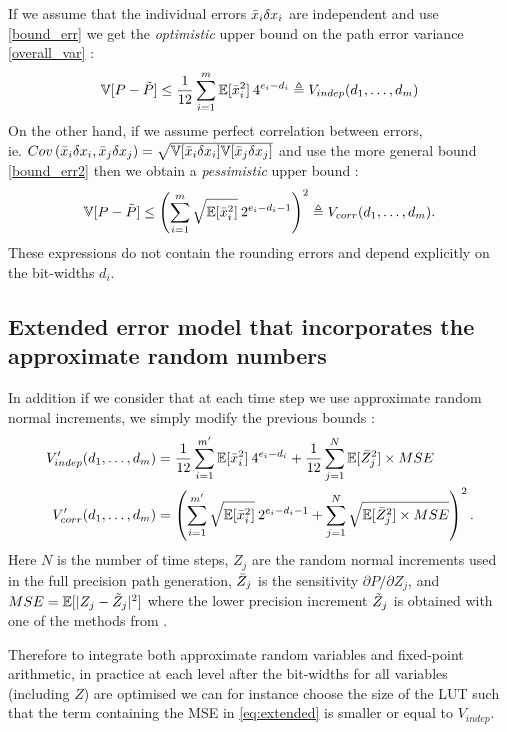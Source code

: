 If we assume that the individual errors $\Bar{x}_i\delta x_i$ are independent and use \eqref{bound_err} we get the \textit{optimistic} upper bound on the path error variance \eqref{overall_var} :
\begin{equation} \label{optimistic}
    \mathbb{V}[P- \Tilde{P}] \leq \frac{1}{12}\sum_{i=1}^m \mathbb{E}[\Bar{x}_i^2] \: 4^{e_i-d_i} \triangleq V_{indep}(d_1,\ldots,d_m)
\end{equation}
On the other hand, if we assume perfect correlation between errors, \\ ie.  $Cov\left(\Bar{x}_i\delta x_i,\Bar{x}_j\delta x_j\right) = \sqrt{\mathbb{V}[\Bar{x}_i\delta x_i]\mathbb{V}[\Bar{x}_j\delta x_j]}$ and use the more general bound \eqref{bound_err2} then we obtain a \textit{pessimistic} upper bound :
\begin{equation} \label{pessimistic}
    \mathbb{V}[P- \Tilde{P}] \leq \left( \sum_{i=1}^m \sqrt{\mathbb{E}[\Bar{x}_i^2]}\: 2^{e_i-d_i-1} \right)^2 \triangleq V_{corr}(d_1,\ldots,d_m).
\end{equation}
These expressions do not contain the rounding errors and depend explicitly on the bit-widths $d_i$. 


\subsection{Extended error model that incorporates the approximate random numbers}
In addition if we consider that at each time step we use approximate random normal increments, we simply modify the previous bounds :
\begin{align} \label{eq:extended}
    V'_{indep}(d_1,\ldots,d_m) &= \frac{1}{12}\sum_{i=1}^{m'} \mathbb{E}[\Bar{x}_i^2]\: 4^{e_i-d_i} + \frac{1}{12}\sum_{j=1}^{N} \mathbb{E}[\Bar{Z}_j^2]\times MSE\\
    V'_{corr}(d_1,\ldots,d_m) &= \left( \sum_{i=1}^{m'} \sqrt{\mathbb{E}[\Bar{x}_i^2]}\: 2^{e_i-d_i-1} + \sum_{j=1}^{N}\sqrt{\mathbb{E}[\Bar{Z}_j^2]\times MSE} \right)^2.
\end{align}
Here $N$ is the number of time steps, $Z_j$ are the random normal increments used in the full precision path generation, $\Bar{Z}_j$ is the sensitivity $\partial P/\partial Z_j$, and $MSE =\mathbb{E}[|Z_j-\Tilde{Z}_j|^2]$ where the lower precision increment $\Tilde{Z}_j$ is obtained with one of the methods from .

Therefore to integrate both approximate random variables and fixed-point arithmetic, in practice at each level after the bit-widths for all variables (including $Z$) are optimised we can for instance choose the size of the LUT such that the term containing the MSE in \eqref{eq:extended} is smaller or equal to $V_{indep}$. 


